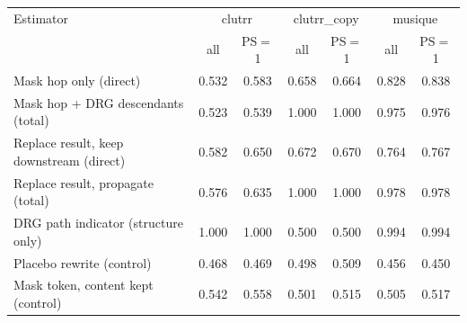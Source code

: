 \begin{tabular}{lcccccc}
\toprule
Estimator & \multicolumn{2}{c}{clutrr} & \multicolumn{2}{c}{clutrr\_copy} & \multicolumn{2}{c}{musique} \\
 & all & PS$=$1 & all & PS$=$1 & all & PS$=$1 \\
\midrule
Mask hop only (direct) & 0.532 & 0.583 & 0.658 & 0.664 & 0.828 & 0.838 \\
Mask hop + DRG descendants (total) & 0.523 & 0.539 & 1.000 & 1.000 & 0.975 & 0.976 \\
Replace result, keep downstream (direct) & 0.582 & 0.650 & 0.672 & 0.670 & 0.764 & 0.767 \\
Replace result, propagate (total) & 0.576 & 0.635 & 1.000 & 1.000 & 0.978 & 0.978 \\
DRG path indicator (structure only) & 1.000 & 1.000 & 0.500 & 0.500 & 0.994 & 0.994 \\
Placebo rewrite (control) & 0.468 & 0.469 & 0.498 & 0.509 & 0.456 & 0.450 \\
Mask token, content kept (control) & 0.542 & 0.558 & 0.501 & 0.515 & 0.505 & 0.517 \\
\bottomrule
\end{tabular}
